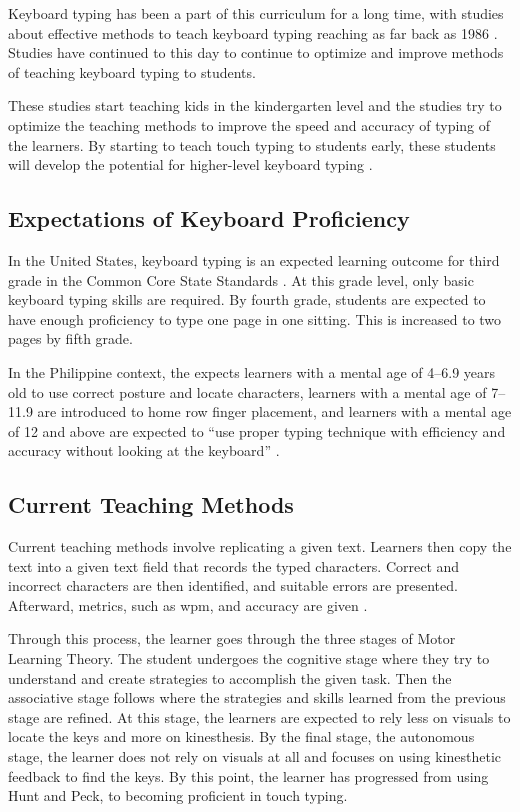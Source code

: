 \documentclass{report}
\begin{document}
Keyboard typing has been a part of this curriculum for a long time, with studies
about effective methods to teach keyboard typing reaching as far back as 1986
\parencite{hoot1986}. Studies have continued to this day to continue to optimize
and improve methods of teaching keyboard typing to students.

These studies start teaching kids in the kindergarten level and the studies try
to optimize the teaching methods to improve the speed and accuracy of typing of
the learners. By starting to teach touch typing to students early, these
students will develop the potential for higher-level keyboard typing
\parencite{donica2018}.

\subsection{Expectations of Keyboard Proficiency}

In the United States, keyboard typing is an expected learning outcome for third
grade in the Common Core State Standards \parencite{ccs}. At this grade level,
only basic keyboard typing skills are required. By fourth grade, students are
expected to have enough proficiency to type one page in one sitting. This is
increased to two pages by fifth grade.

In the Philippine context, the \citeauthor{deped} expects learners with a mental
age of 4--6.9 years old to use correct posture and locate characters, learners
with a mental age of 7--11.9 are introduced to home row finger placement, and
learners with a mental age of 12 and above are expected to ``use proper typing
technique with efficiency and accuracy without looking at the keyboard''
\parencite{deped}.

\subsection{Current Teaching Methods}

Current teaching methods involve replicating a given text. Learners then copy
the text into a given text field that records the typed characters. Correct and
incorrect characters are then identified, and suitable errors are presented.
Afterward, metrics, such as \ac{wpm}, and accuracy are given
\parencite{bartnik2021, typeracer}.

Through this process, the learner goes through the three stages of Motor
Learning Theory. The student undergoes the cognitive stage where they try to
understand and create strategies to accomplish the given task. Then the
associative stage follows where the strategies and skills learned from the
previous stage are refined. At this stage, the learners are expected to rely less
on visuals to locate the keys and more on kinesthesis. By the final stage, the
autonomous stage, the learner does not rely on visuals at all and focuses on
using kinesthetic feedback to find the keys. By this point, the learner has
progressed from using Hunt and Peck, to becoming proficient in touch typing.
\parencite{donica2018}
\end{document}
